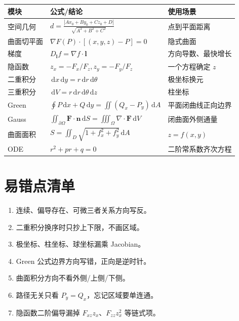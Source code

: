 \documentclass[UTF8,zihao=-4]{ctexart}
\newcommand{\dd}{\,\mathrm d}
\newcommand{\ve}[1]{\bm{#1}}
\newcommand{\grad}{\nabla}
\begin{document}
\begin{longtable}{p{}p{}p{}}
\toprule
\textbf{模块} & \textbf{公式/结论} & \textbf{使用场景} \\
\midrule
空间几何 & $d=\frac{|Ax_0+By_0+Cz_0+D|}{\sqrt{A^2+B^2+C^2}}$ & 点到平面距离 \\
曲面切平面 & $\grad F(P)\cdot[(x,y,z)-P]=0$ & 隐式曲面 \\
梯度 & $D_{\ve l}f=\grad f\cdot\ve l$ & 方向导数、最快增长 \\
隐函数 & $z_x=-F_x/F_z,z_y=-F_y/F_z$ & 一个方程确定 $z$ \\
二重积分 & $\dd x\dd y=r\dd r\dd\theta$ & 极坐标换元 \\
三重积分 & $\dd V=r\dd r\dd\theta\dd z$ & 柱坐标 \\
Green & $\oint P\dd x+Q\dd y=\iint(Q_x-P_y)\dd A$ & 平面闭曲线正向边界 \\
Gauss & $\iint_{\partial\Omega}\ve F\cdot\ve n\dd S=\iiint_{\Omega}\nabla\cdot\ve F\dd V$ & 闭曲面外侧通量 \\
曲面面积 & $S=\iint_D\sqrt{1+f_x^2+f_y^2}\dd A$ & $z=f(x,y)$ \\
ODE & $r^2+pr+q=0$ & 二阶常系数齐次方程 \\
\bottomrule
\end{longtable}

\section{易错点清单}
\begin{warnbox}[高频扣分点]
\begin{enumerate}
  \item 连续、偏导存在、可微三者关系方向写反。
  \item 二重积分换序时只抄上下限，不画区域。
  \item 极坐标、柱坐标、球坐标漏乘 Jacobian。
  \item Green 公式边界方向写错，正向是逆时针。
  \item 曲面积分方向不看外侧/上侧/下侧。
  \item 路径无关只看 $P_y=Q_x$，忘记区域要单连通。
  \item 隐函数二阶偏导漏掉 $F_{xz}z_x$、$F_{zz}z_x^2$ 等链式项。
\end{enumerate}
\end{warnbox}
\end{document}
